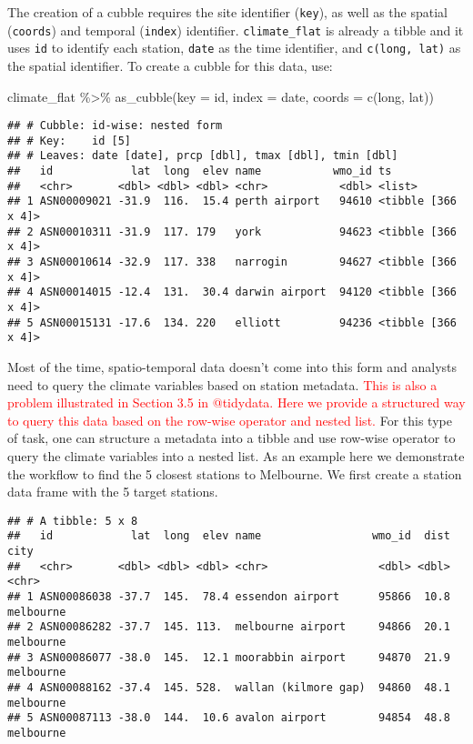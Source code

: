 \documentclass{article}
\newenvironment{Shaded}{\begin{snugshade}}{\end{snugshade}}
\newcommand{\AttributeTok}[1]{\textcolor[rgb]{0.77,0.63,0.00}{#1}}
\newcommand{\FunctionTok}[1]{\textcolor[rgb]{0.00,0.00,0.00}{#1}}
\newcommand{\NormalTok}[1]{#1}
\newcommand{\SpecialCharTok}[1]{\textcolor[rgb]{0.00,0.00,0.00}{#1}}
\begin{document}
The creation of a cubble requires the site identifier (\texttt{key}), as
well as the spatial (\texttt{coords}) and temporal (\texttt{index})
identifier. \texttt{climate\_flat} is already a tibble and it uses
\texttt{id} to identify each station, \texttt{date} as the time
identifier, and \texttt{c(long,\ lat)} as the spatial identifier. To
create a cubble for this data, use:

\begin{Shaded}
\begin{Highlighting}[]
\NormalTok{climate\_flat }\SpecialCharTok{\%\textgreater{}\%} \FunctionTok{as\_cubble}\NormalTok{(}\AttributeTok{key =}\NormalTok{ id, }\AttributeTok{index =}\NormalTok{ date, }\AttributeTok{coords =} \FunctionTok{c}\NormalTok{(long, lat))}
\end{Highlighting}
\end{Shaded}

\begin{verbatim}
## # Cubble: id-wise: nested form
## # Key:    id [5]
## # Leaves: date [date], prcp [dbl], tmax [dbl], tmin [dbl]
##   id            lat  long  elev name           wmo_id ts                
##   <chr>       <dbl> <dbl> <dbl> <chr>           <dbl> <list>            
## 1 ASN00009021 -31.9  116.  15.4 perth airport   94610 <tibble [366 x 4]>
## 2 ASN00010311 -31.9  117. 179   york            94623 <tibble [366 x 4]>
## 3 ASN00010614 -32.9  117. 338   narrogin        94627 <tibble [366 x 4]>
## 4 ASN00014015 -12.4  131.  30.4 darwin airport  94120 <tibble [366 x 4]>
## 5 ASN00015131 -17.6  134. 220   elliott         94236 <tibble [366 x 4]>
\end{verbatim}

Most of the time, spatio-temporal data doesn't come into this form and
analysts need to query the climate variables based on station metadata.
\textcolor{red}{This is also a problem illustrated in Section 3.5 in @tidydata. Here we provide a structured way to query this data based on the row-wise operator and nested list.}
For this type of task, one can structure a metadata into a tibble and
use row-wise operator to query the climate variables into a nested list.
As an example here we demonstrate the workflow to find the 5 closest
stations to Melbourne. We first create a station data frame with the 5
target stations.

\begin{verbatim}
## # A tibble: 5 x 8
##   id            lat  long  elev name                 wmo_id  dist city     
##   <chr>       <dbl> <dbl> <dbl> <chr>                 <dbl> <dbl> <chr>    
## 1 ASN00086038 -37.7  145.  78.4 essendon airport      95866  10.8 melbourne
## 2 ASN00086282 -37.7  145. 113.  melbourne airport     94866  20.1 melbourne
## 3 ASN00086077 -38.0  145.  12.1 moorabbin airport     94870  21.9 melbourne
## 4 ASN00088162 -37.4  145. 528.  wallan (kilmore gap)  94860  48.1 melbourne
## 5 ASN00087113 -38.0  144.  10.6 avalon airport        94854  48.8 melbourne
\end{verbatim}
\end{document}
